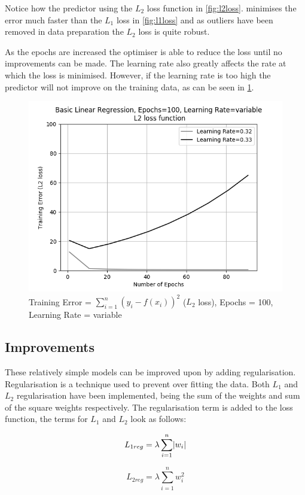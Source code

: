 \documentclass[10pt,twocolumn,letterpaper]{article}
\DeclarePairedDelimiter\abs{\lvert}{\rvert}%
\begin{document}
Notice how the predictor using the $L_2$ loss function in \ref{fig:l2loss}. minimises the error much faster than the $L_1$ loss in \ref{fig:l1loss} and as outliers have been removed in data preparation the $L_2$ loss is quite robust.

As the epochs are increased the optimiser is able to reduce the loss until no improvements can be made. The learning rate also greatly affects the rate at which the loss is minimised. However, if the learning rate is too high the predictor will not improve on the training data, as can be seen in \ref{fig:break}.

\begin{figure}[h]
	\begin{center}
		\includegraphics[width=0.9\linewidth]{img/linrbreak.png}
	\end{center}
	\caption{Training Error = $\sum_{i = 1}^{n} (y_i - f(x_i))^2$ ($L_2$ loss), Epochs = 100, Learning Rate = variable}
	\label{fig:break}
\end{figure}

\subsection{Improvements}
These relatively simple models can be improved upon by adding regularisation. Regularisation is a technique used to prevent over fitting the data. Both $L_1$ and $L_2$ regularisation have been implemented, being the sum of the weights and sum of the square weights respectively. The regularisation term is added to the loss function, the terms for $L_1$ and $L_2$ look as follows:

\noindent\begin{minipage}{.5\linewidth}
	\begin{equation}
	L_{1reg} = \lambda \sum_{i = 1}^{n} \abs{w_i}
	\end{equation}
\end{minipage}%
\begin{minipage}{.5\linewidth}
	\begin{equation}
	L_{2reg} = \lambda \sum_{i = 1}^{n} w_i^2
	\end{equation}
\end{minipage}
\end{document}
